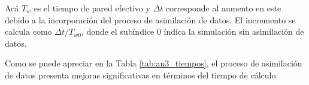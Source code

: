 Acá $T_w$ es el tiempo de pared efectivo y $\Delta t$ corresponde al aumento en este debido a la incorporación del proceso de asimilación de datos. El incremento se calcula como $\Delta t/T_{w0}$, donde el subíndice 0 índica la simulación sin asimilación de datos.

Como se puede apreciar en la Tabla \ref{tab:an3_tiempos}, el proceso de asimilación de datos presenta mejoras significativas en términos del tiempo de cálculo.

